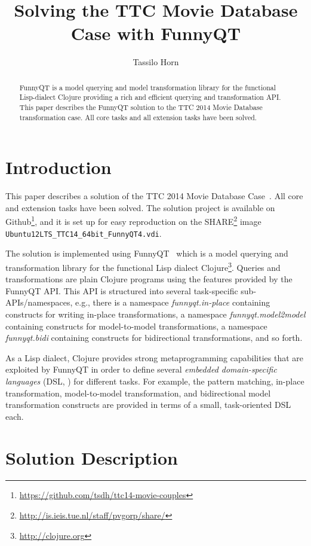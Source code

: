 \documentclass[submission]{eptcs}
\title{Solving the TTC Movie Database Case with FunnyQT}
\author{Tassilo Horn
  \institute{Institute for Software Technology, University Koblenz-Landau, Germany}
  \email{horn@uni-koblenz.de}}
\begin{document}
\maketitle

\begin{abstract}
  FunnyQT is a model querying and model transformation library for the
  functional Lisp-dialect Clojure providing a rich and efficient querying and
  transformation API.  This paper describes the FunnyQT solution to the TTC
  2014 Movie Database transformation case.  All core tasks and all extension
  tasks have been solved.
\end{abstract}


\section{Introduction}
\label{sec:introduction}

This paper describes a solution of the TTC 2014 Movie Database
Case~\cite{movies-case-desc}.  All core and extension tasks have been solved.
The solution project is available on
Github\footnote{\url{https://github.com/tsdh/ttc14-movie-couples}}, and it is
set up for easy reproduction on the
SHARE\footnote{\url{http://is.ieis.tue.nl/staff/pvgorp/share/}} image
\texttt{Ubuntu12LTS\_TTC14\_64bit\_FunnyQT4.vdi}.

The solution is implemented using FunnyQT~\cite{Horn2013MQWFQ} which is a model
querying and transformation library for the functional Lisp dialect
Clojure\footnote{\url{http://clojure.org}}.  Queries and transformations are
plain Clojure programs using the features provided by the FunnyQT API.  This
API is structured into several task-specific sub-APIs/namespaces, e.g., there
is a namespace \emph{funnyqt.in-place} containing constructs for writing
in-place transformations, a namespace \emph{funnyqt.model2model} containing
constructs for model-to-model transformations, a namespace \emph{funnyqt.bidi}
containing constructs for bidirectional transformations, and so forth.

As a Lisp dialect, Clojure provides strong metaprogramming capabilities that
are exploited by FunnyQT in order to define several \emph{embedded
  domain-specific languages} (DSL, \cite{book:Fowler2010DSL}) for different
tasks.  For example, the pattern matching, in-place transformation,
model-to-model transformation, and bidirectional model transformation
constructs are provided in terms of a small, task-oriented DSL each.


\section{Solution Description}
\label{sec:solution-description}
\end{document}
